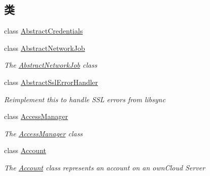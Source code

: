 \subsection*{类}
\begin{DoxyCompactItemize}
\item 
class \hyperlink{class_o_c_c_1_1_abstract_credentials}{Abstract\+Credentials}
\item 
class \hyperlink{class_o_c_c_1_1_abstract_network_job}{Abstract\+Network\+Job}
\begin{DoxyCompactList}\small\item\em The \hyperlink{class_o_c_c_1_1_abstract_network_job}{Abstract\+Network\+Job} class \end{DoxyCompactList}\item 
class \hyperlink{class_o_c_c_1_1_abstract_ssl_error_handler}{Abstract\+Ssl\+Error\+Handler}
\begin{DoxyCompactList}\small\item\em Reimplement this to handle S\+SL errors from libsync \end{DoxyCompactList}\item 
class \hyperlink{class_o_c_c_1_1_access_manager}{Access\+Manager}
\begin{DoxyCompactList}\small\item\em The \hyperlink{class_o_c_c_1_1_access_manager}{Access\+Manager} class \end{DoxyCompactList}\item 
class \hyperlink{class_o_c_c_1_1_account}{Account}
\begin{DoxyCompactList}\small\item\em The \hyperlink{class_o_c_c_1_1_account}{Account} class represents an account on an own\+Cloud Server


\end{DoxyCompactList}
\end{DoxyCompactItemize}
